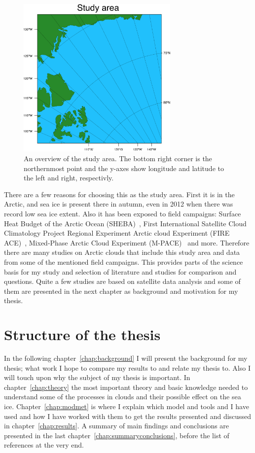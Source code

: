 \begin{figure}
\centering
\includegraphics[width=0.7\textwidth]{introduction/studyarea.png}
\caption{An overview of the study area. The bottom right corner is the northernmost point and the y-axes show longitude and latitude to the left and right, respectivly.}
\label{fig:area}
\end{figure}
 
There are a few reasons for choosing this as the study area. First it is in the Arctic, and sea ice is present there in autumn, even in 2012 when there was record low sea ice extent. Also it has been exposed to field campaigns: Surface Heat Budget of the Arctic Ocean (SHEBA)~\citep{Uttal2002}, First International Satellite Cloud Climatology Project Regional Experiment Arctic cloud Experiment (FIRE ACE)~\citep{Curry2000}, Mixed-Phase Arctic Cloud Experiment (M-PACE)~\citep{Verlinde2007} and more. Therefore there are many studies on Arctic clouds that include this study area and data from some of the mentioned field campaigns. This provides parts of the science basis for my study and selection of literature and studies for comparison and questions. Quite a few studies are based on satellite data analysis and some of them are presented in the next chapter as background and motivation for my thesis.

\section{Structure of the thesis}
In the following chapter~\ref{chap:background} I will present the background for my thesis; what work I hope to compare my results to and relate my thesis to. Also I will touch upon why the subject of my thesis is important. In chapter~\ref{chap:theory} the most important theory and basic knowledge needed to understand some of the processes in clouds and their possible effect on the sea ice. Chapter~\ref{chap:modmet} is where I explain which model and tools and I have used and how I have worked with them to get the results presented and discussed in chapter~\ref{chap:results}.%
 A summary of main findings and conclusions are presented in the last chapter~\ref{chap:summaryconclusions}, before the list of references at the very end.


